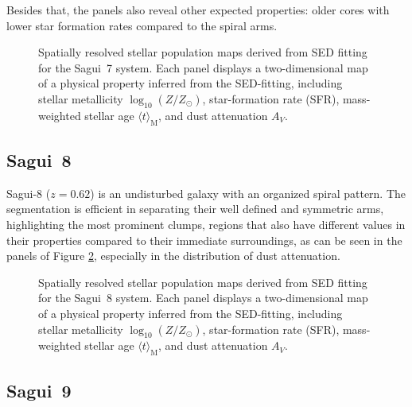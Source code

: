 \documentclass[fleqn,usenatbib]{mnras}
\begin{document}
Besides that, the panels  also reveal other expected properties: older cores with lower star formation rates compared to the spiral arms.


\begin{figure}
\centering
{}
\caption{Spatially resolved stellar population maps derived from SED fitting for the Sagui~7 system. Each panel displays a two-dimensional map of a physical property inferred from the SED-fitting, including stellar metallicity $\log_{10}(Z/Z_\odot)$, star-formation rate (SFR), mass-weighted stellar age $\langle t\rangle_{\mathrm{M}}$, and dust attenuation $A_V$.}
\label{fig:starlet_sagui7}
\end{figure}



\subsection{Sagui~8}
Sagui-8 ($z=0.62$) is an undisturbed galaxy with an organized spiral pattern. The segmentation is efficient in separating their well defined and symmetric arms, highlighting the most prominent clumps, regions that also have different values in their properties compared to their immediate surroundings, as can be seen in the panels of Figure \ref{fig:starlet_sagui8}, especially in the distribution of dust attenuation.


\begin{figure}
\centering
{}
\caption{Spatially resolved stellar population maps derived from SED fitting for the Sagui~8 system. Each panel displays a two-dimensional map of a physical property inferred from the SED-fitting, including stellar metallicity $\log_{10}(Z/Z_\odot)$, star-formation rate (SFR), mass-weighted stellar age $\langle t\rangle_{\mathrm{M}}$, and dust attenuation $A_V$.}
\label{fig:starlet_sagui8}
\end{figure}

\subsection{Sagui~9}
\end{document}

